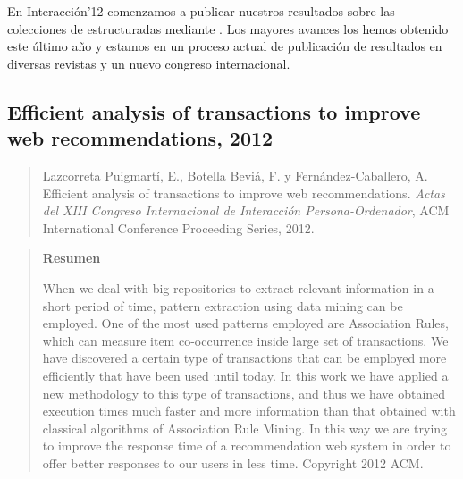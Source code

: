 En Interacción'12 comenzamos a publicar nuestros resultados sobre las colecciones de \transacciones estructuradas mediante \catalogos. Los mayores avances los hemos obtenido este último año y estamos en un proceso actual de publicación de resultados en diversas revistas y un nuevo congreso internacional.





\subsection*{Efficient analysis of transactions to improve web recommendations, 2012}

\begin{quote}
  Lazcorreta Puigmartí, E., Botella Beviá, F. y Fernández-Caballero, A. Efficient analysis of transactions to improve web recommendations. {\em Actas del XIII Congreso Internacional de Interacción Persona-Ordenador}, ACM International Conference Proceeding Series, 2012. 
\end{quote}

\begin{quotation}
	\noindent\textbf{Resumen}

	\nopagebreak When we deal with big repositories to extract relevant information in a short period of time, pattern extraction using data mining can be employed. One of the most used patterns employed are Association Rules, which can measure item co-occurrence inside large set of transactions. We have discovered a certain type of transactions that can be employed more efficiently that have been used until today. In this work we have applied a new methodology to this type of transactions, and thus we have obtained execution times much faster and more information than that obtained with classical algorithms of Association Rule Mining. In this way we are trying to improve the response time of a recommendation web system in order to offer better responses to our users in less time. Copyright 2012 ACM.
\end{quotation}








